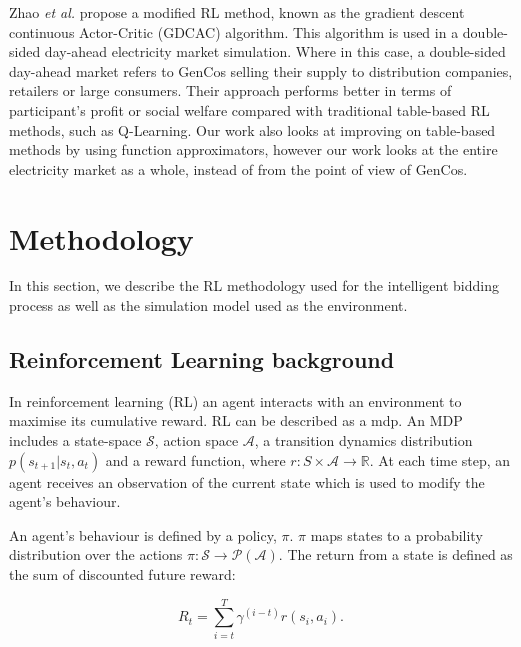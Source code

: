 Zhao \textit{et al.} \cite{Zhao2016} propose a modified RL method, known as the gradient descent continuous Actor-Critic (GDCAC) algorithm. This algorithm is used in a double-sided day-ahead electricity market simulation. Where in this case, a double-sided day-ahead market refers to GenCos selling their supply to distribution companies, retailers or large consumers. Their approach performs better in terms of participant's profit or social welfare compared with traditional table-based RL methods, such as Q-Learning. Our work also looks at improving on table-based methods by using function approximators, however our work looks at the entire electricity market as a whole, instead of from the point of view of GenCos.





\section{Methodology}
\label{rl:sec:material}

In this section, we describe the RL methodology used for the intelligent bidding process as well as the simulation model used as the environment.

\subsection{Reinforcement Learning background}


In reinforcement learning (RL) an agent interacts with an environment to maximise its cumulative reward. RL can be described as a \acrfull{mdp}. An MDP includes a state-space $\mathcal{S}$, action space $\mathcal{A}$, a transition dynamics distribution $p(s_{t+1}|s_t,a_t)$ and a reward function, where $r:S\times \mathcal{A} \rightarrow \mathbb{R}$. At each time step, an agent receives an observation of the current state which is used to modify the agent's behaviour.

An agent's behaviour is defined by a policy, $\pi$. $\pi$ maps states to a probability distribution over the actions $\pi:\mathcal{S}\rightarrow \mathcal{P}(\mathcal{A})$. The return from a state is defined as the sum of discounted future reward:

\begin{equation}
R_t=\sum_{i=t}^T\gamma^{(i-t)}r(s_i,a_i).
\end{equation}

